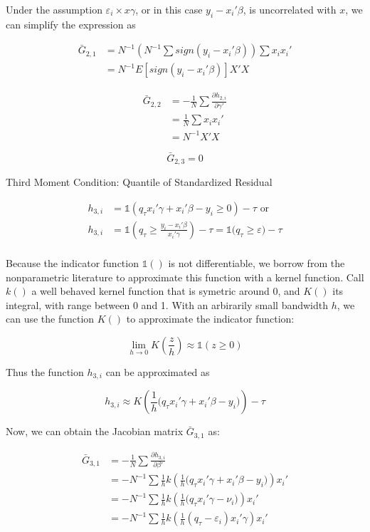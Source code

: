 \documentclass[
  authoryear,
  review,
  1p]{elsarticle}
\begin{document}
Under the assumption \(\varepsilon_i \times x\gamma\), or in this case
\(y_i-x_i'\beta\), is uncorrelated with \(x\), we can simplify the
expression as

\[\begin{aligned}
\bar G_{2,1} &= N^{-1} \left(N^{-1}\sum sign(y_i-x_i'\beta)\right) \sum x_i x_i' \\
&= N^{-1} E[sign(y_i-x_i'\beta)] X'X
\end{aligned}
\]

\[\begin{aligned}
\bar G_{2,2} &= -\frac{1}{N} \sum \frac{\partial h_{2,i}}{\partial \gamma'} \\
             &=  \frac{1}{N} \sum x_i x_i' \\
             &= N^{-1} X'X
\end{aligned}
\]

\[\bar G_{2,3}=0\]

Third Moment Condition: Quantile of Standardized Residual

\[\begin{aligned}
h_{3,i} &= \mathbb{1}\left( q_\tau  x_i'\gamma +x_i'\beta - y_i \geq 0 \right) - \tau \text{ or}\\
h_{3,i} &= \mathbb{1}\left( q_\tau  \geq \frac{y_i- x_i'\beta}{x_i'\gamma}  \right) - \tau = \mathbb{1}\big( q_\tau \geq \varepsilon  \big) - \tau \\
\end{aligned}
\]

Because the indicator function \(\mathbb{1}()\) is not differentiable,
we borrow from the nonparametric literature to approximate this function
with a kernel function. Call \(k()\) a well behaved kernel function that
is symetric around 0, and \(K()\) its integral, with range between 0 and
1. With an arbirarily small bandwidth \(h\), we can use the function
\(K()\) to approximate the indicator function:

\[
\lim_{h\rightarrow 0} K\left(\frac{z}{h}\right) \approx \mathbb{1}(z\geq 0)
\]

Thus the function \(h_{3,i}\) can be approximated as

\[h_{3,i} \approx K\left( \frac{1}{h} \Big( q_\tau x_i'\gamma +x_i'\beta - y_i  \Big) \right) - \tau
\]

Now, we can obtain the Jacobian matrix \(\bar G_{3,1}\) as:

\[\begin{aligned}
\bar G_{3,1} &= -\frac{1}{N} \sum \frac{\partial h_{3,i}}{\partial \beta'} \\
             &= -N^{-1} \sum \frac{1}{h} k\left( \frac{1}{h} \Big( q_\tau x_i'\gamma +x_i'\beta - y_i  \Big) \right) x_i' \\ 
             &= -N^{-1} \sum \frac{1}{h} k\left( \frac{1}{h} \big( q_\tau x_i'\gamma - \nu_i \big)   \right) x_i'  \\
             &= -N^{-1} \sum \frac{1}{h} k\left( \frac{1}{h} ( q_\tau - \varepsilon_i ) x_i'\gamma  \right) x_i'  
\end{aligned}
\]
\end{document}
